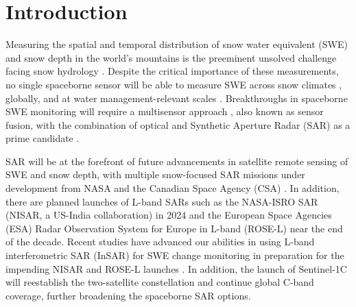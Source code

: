 \hypertarget{ch4-intro}{\section{Introduction}\label{ch4-intro}}

Measuring the spatial and temporal distribution of snow water equivalent (SWE) and snow depth in the world’s mountains is the preeminent unsolved challenge facing snow hydrology \citep{dozierEstimatingSpatialDistribution2016}. Despite the critical importance of these measurements, no single spaceborne sensor will be able to measure SWE across snow climates \citep{sturmSeasonalSnowCover1995, sturmRevisitingGlobalSeasonal2021}, globally, and at water management-relevant scales \citep{lettenmaierInroadsRemoteSensing2015}. Breakthroughs in spaceborne SWE monitoring will require a multisensor approach \citep{durandAchievingBreakthroughsGlobal2021}, also known as sensor fusion, with the combination of optical and Synthetic Aperture Radar (SAR) as a prime candidate \citep{tarriconeEstimatingSnowAccumulation2023a,lievensSnowDepthVariability2019, lievensSentinel1SnowDepth2022}. 

SAR will be at the forefront of future advancements in satellite remote sensing of SWE and snow depth, with multiple snow-focused SAR missions under development from NASA and the Canadian Space Agency (CSA) \citep{tsangReviewArticleGlobal2022, yuehSatelliteSyntheticAperture2021, garnaudQuantifyingSnowMass2019}. In addition, there are planned launches of L-band SARs such as the NASA-ISRO SAR (NISAR, a US-India collaboration) in 2024 and the European Space Agencies (ESA) Radar Observation System for Europe in L-band (ROSE-L) near the end of the decade. Recent studies have advanced our abilities in using L-band interferometric SAR (InSAR) for SWE change monitoring in preparation for the impending NISAR and ROSE-L launches \citep{tarriconeEstimatingSnowAccumulation2023a, marshallLBandInSARDepth2021, naglerAirborneExperimentInsar2022}. In addition, the launch of Sentinel-1C will reestablish the two-satellite constellation and continue global C-band coverage, further broadening the spaceborne SAR options. 

